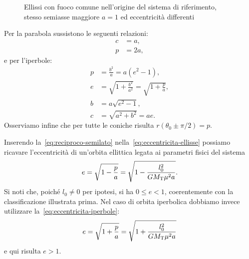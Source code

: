 \begin{figure}
  \centering
  \caption[Ellissi con diversi valori di eccentricità]{Ellissi con fuoco comune
    nell'origine del sistema di riferimento, stesso semiasse maggiore $a=1$ ed
    eccentricità differenti}
  \label{fig:ellissi-eccentricita}
\end{figure}

Per la parabola sussistono le seguenti relazioni:
\begin{align}
  c &= a,\\
  p &= 2a,
\end{align}
e per l'iperbole:
\begin{align}
  p &= \frac{b^2}{a} = a(e^2-1), \label{eq:semilato-iperbole}\\
  e &= \sqrt{1+\frac{b^2}{a^2}} =
  \sqrt{1+\frac{p}{a}}, \label{eq:eccentricita-iperbole}\\
  b &= a\sqrt{e^2-1}, \\
  c &= \sqrt{a^2+b^2} = ae.
\end{align}
Osserviamo infine che per tutte le coniche risulta $r(\theta_0\pm\pi/2)=p$.

Inserendo la~\eqref{eq:reciproco-semilato} nella~\eqref{eq:eccentricita-ellisse}
possiamo ricavare l'eccentricità di un'orbita ellittica legata ai parametri
fisici del sistema
\begin{equation}
  \label{eq:eccentricita-orbita-ellisse}
  e = \sqrt{1-\frac{p}{a}} = \sqrt{1-\frac{l_0^2}{GM_\textup{T}\mu^2a}}.
\end{equation}
Si noti che, poiché $l_0\neq 0$ per ipotesi, si ha $0\leq e<1$, coerentemente
con la classificazione illustrata prima. Nel caso di orbita iperbolica dobbiamo
invece utilizzare la~\eqref{eq:eccentricita-iperbole}:
\begin{equation}
  \label{eq:eccentricita-orbita-iperbole}
  e = \sqrt{1+\frac{p}{a}} = \sqrt{1+\frac{l_0^2}{GM_\textup{T}\mu^2a}}
\end{equation}
e qui risulta $e>1$.


